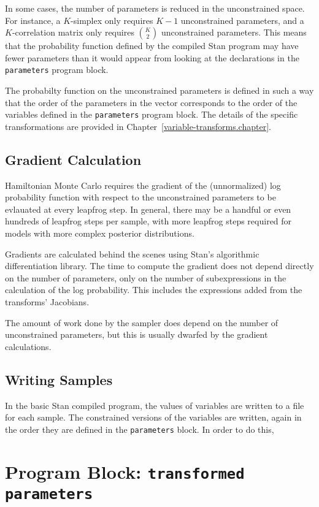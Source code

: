 \documentclass[10pt]{report}
\newcommand{\Stan}{Stan\xspace}
\newcommand{\code}[1]{{\tt #1}}
\newcommand{\refchapter}[1]{Chapter~\ref{#1.chapter}}
\begin{document}
In some cases, the number of parameters is reduced in the
unconstrained space.  For instance, a $K$-simplex only requires $K-1$
unconstrained parameters, and a $K$-correlation matrix only requires
${K \choose 2}$ unconstrained parameters.  This means that the
probability function defined by the compiled \Stan program may have
fewer parameters than it would appear from looking at the declarations
in the \code{parameters} program block. 

The probabilty function on the unconstrained parameters is defined in
such a way that the order of the parameters in the vector corresponds
to the order of the variables defined in the \code{parameters} program
block.  The details of the specific transformations are provided in
\refchapter{variable-transforms}.

\subsection{Gradient Calculation}

Hamiltonian Monte Carlo requires the gradient of the (unnormalized)
log probability function with respect to the unconstrained parameters
to be evlauated at every leapfrog step.  In general, there may be a
handful or even hundreds of leapfrog steps per sample, with more
leapfrog steps required for models with more complex posterior distributions.

Gradients are calculated behind the scenes using \Stan's algorithmic
differentiation library.  The time to compute the gradient does not
depend directly on the number of parameters, only on the number of
subexpressions in the calculation of the log probability.  This
includes the expressions added from the transforms' Jacobians.  

The amount of work done by the sampler does depend on the number of
unconstrained parameters, but this is usually dwarfed by the gradient
calculations.

\subsection{Writing Samples}

In the basic \Stan compiled program, the values of variables are
written to a file for each sample.  The constrained versions of the
variables are written, again in the order they are defined in the
\code{parameters} block.  In order to do this, 


\section{Program Block: \code{transformed parameters}}
\end{document}
